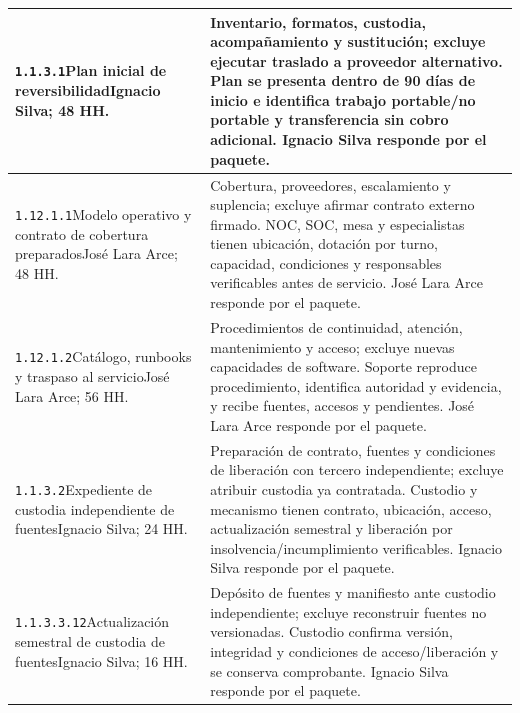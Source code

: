 \begin{longtable}{L{52mm}L{91mm}}
\texttt{1.\allowbreak{}1.\allowbreak{}3.\allowbreak{}1}\newline Plan inicial de reversibilidad\newline Ignacio Silva; 48 HH. & Inventario, formatos, custodia, acompañamiento y sustitución; excluye ejecutar traslado a proveedor alternativo. Plan se presenta dentro de 90 días de inicio e identifica trabajo portable/no portable y transferencia sin cobro adicional. Ignacio Silva responde por el paquete.\\\hline
\texttt{1.\allowbreak{}12.\allowbreak{}1.\allowbreak{}1}\newline Modelo operativo y contrato de cobertura preparados\newline José Lara Arce; 48 HH. & Cobertura, proveedores, escalamiento y suplencia; excluye afirmar contrato externo firmado. NOC, SOC, mesa y especialistas tienen ubicación, dotación por turno, capacidad, condiciones y responsables verificables antes de servicio. José Lara Arce responde por el paquete.\\\hline
\texttt{1.\allowbreak{}12.\allowbreak{}1.\allowbreak{}2}\newline Catálogo, runbooks y traspaso al servicio\newline José Lara Arce; 56 HH. & Procedimientos de continuidad, atención, mantenimiento y acceso; excluye nuevas capacidades de software. Soporte reproduce procedimiento, identifica autoridad y evidencia, y recibe fuentes, accesos y pendientes. José Lara Arce responde por el paquete.\\\hline
\texttt{1.\allowbreak{}1.\allowbreak{}3.\allowbreak{}2}\newline Expediente de custodia independiente de fuentes\newline Ignacio Silva; 24 HH. & Preparación de contrato, fuentes y condiciones de liberación con tercero independiente; excluye atribuir custodia ya contratada. Custodio y mecanismo tienen contrato, ubicación, acceso, actualización semestral y liberación por insolvencia/incumplimiento verificables. Ignacio Silva responde por el paquete.\\\hline
\texttt{1.\allowbreak{}1.\allowbreak{}3.\allowbreak{}3.\allowbreak{}12}\newline Actualización semestral de custodia de fuentes\newline Ignacio Silva; 16 HH. & Depósito de fuentes y manifiesto ante custodio independiente; excluye reconstruir fuentes no versionadas. Custodio confirma versión, integridad y condiciones de acceso/liberación y se conserva comprobante. Ignacio Silva responde por el paquete.\\\hline

\end{longtable}
